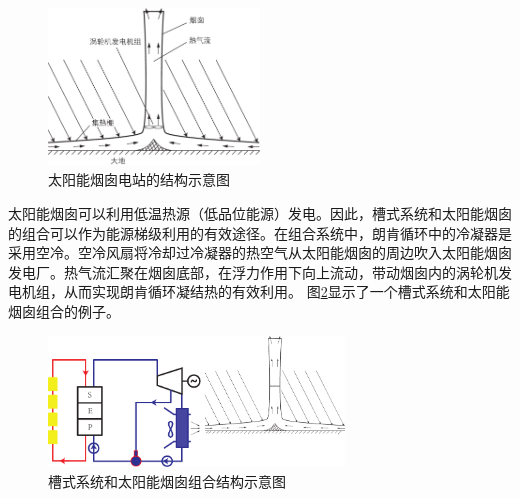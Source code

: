 \begin{figure}[!ht]
\centering 
\includegraphics[width=0.5\textwidth]{fig/SolarChimney}
\caption{太阳能烟囱电站的结构示意图}\label{fig:SolarChimney}
\end{figure}

太阳能烟囱可以利用低温热源（低品位能源）发电。因此，槽式系统和太阳能烟囱的组合可以作为能源梯级利用的有效途径。在组合系统中，朗肯循环中的冷凝器是采用空冷。空冷风扇将冷却过冷凝器的热空气从太阳能烟囱的周边吹入太阳能烟囱发电厂。热气流汇聚在烟囱底部，在浮力作用下向上流动，带动烟囱内的涡轮机发电机组，从而实现朗肯循环凝结热的有效利用。
图\ref{fig:CombinedSolarChimney}显示了一个槽式系统和太阳能烟囱组合的例子。

\begin{figure}[!ht]
\centering 
\includegraphics[width=0.7\textwidth]{fig/CombinedSolarChimney}
\caption{槽式系统和太阳能烟囱组合结构示意图}\label{fig:CombinedSolarChimney}
\end{figure}

